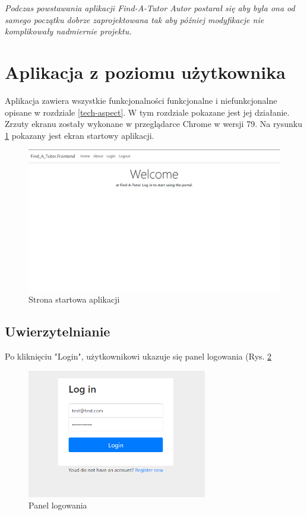 \documentclass[12pt]{article}
\numberwithin{figure}{section}
\begin{document}
\begin{sloppypar}
\textit{Podczas powstawania aplikacji Find-A-Tutor Autor postarał się aby była ona od samego początku dobrze zaprojektowana tak aby później modyfikacje nie komplikowały nadmiernie projektu. }

\section{Aplikacja z poziomu użytkownika}
Aplikacja zawiera wszystkie funkcjonalności funkcjonalne i niefunkcjonalne opisane w rozdziale \ref{tech-aspect}. W tym rozdziale pokazane jest jej działanie. Zrzuty ekranu zostały wykonane w przeglądarce Chrome w wersji 79. Na rysunku \ref{fig:home} pokazany jest ekran startowy aplikacji.

\begin{figure}[H] 
    \centering
    \includegraphics[width=1\textwidth]{images/chapter_4/home.png}
    \caption{Strona startowa aplikacji}
    \label{fig:home}
\end{figure}

\subsection{Uwierzytelnianie}
Po kliknięciu "Login", użytkownikowi ukazuje się panel logowania (Rys. \ref{fig:login}
\begin{figure}[H] 
    \centering
    \includegraphics[width=0.7\textwidth]{images/chapter_4/login.png}
    \caption{Panel logowania}
    \label{fig:login}
\end{figure}


\end{sloppypar}
\end{document}
